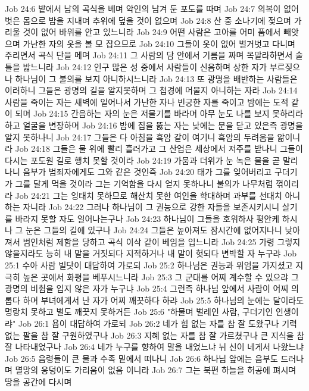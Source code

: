 Job 24:6  밭에서 남의 곡식을 베며 악인의 남겨 둔 포도를 따며
Job 24:7  의복이 없어 벗은 몸으로 밤을 지내며 추위에 덮을 것이 없으며
Job 24:8  산 중 소나기에 젖으며 가리울 것이 없어 바위를 안고 있느니라
Job 24:9  어떤 사람은 고아를 어미 품에서 빼앗으며 가난한 자의 옷을 볼 모 잡으므로
Job 24:10  그들이 옷이 없어 벌거벗고 다니며 주리면서 곡식 단을 메며
Job 24:11  그 사람의 담 안에서 기름을 짜며 목말라하면서 술 틀을 밟느니라
Job 24:12  인구 많은 성 중에서 사람들이 신음하며 상한 자가 부르짖으나 하나님이 그 불의를 보지 아니하시느니라
Job 24:13  또 광명을 배반하는 사람들은 이러하니 그들은 광명의 길을 알지못하며 그 첩경에 머물지 아니하는 자라
Job 24:14  사람을 죽이는 자는 새벽에 일어나서 가난한 자나 빈궁한 자를 죽이고 밤에는 도적 같이 되며
Job 24:15  간음하는 자의 눈은 저물기를 바라며 아무 눈도 나를 보지 못하리라 하고 얼굴을 변장하며
Job 24:16  밤에 집을 뚫는 자는 낮에는 문을 닫고 있은즉 광명을 알지 못하나니
Job 24:17  그들은 다 아침을 흑암 같이 여기니 흑암의 두려움을 앎이니라
Job 24:18  그들은 물 위에 빨리 흘러가고 그 산업은 세상에서 저주를 받나니 그들이 다시는 포도원 길로 행치 못할 것이라
Job 24:19  가뭄과 더위가 눈 녹은 물을 곧 말리나니 음부가 범죄자에게도 그와 같은 것인즉
Job 24:20  태가 그를 잊어버리고 구더기가 그를 달게 먹을 것이라 그는 기억함을 다시 얻지 못하나니 불의가 나무처럼 꺾이리라
Job 24:21  그는 잉태치 못하므로 해산치 못한 여인을 학대하며 과부를 선대치 아니하는 자니라
Job 24:22  그러나 하나님이 그 권능으로 강한 자들을 보존시키시니 살기를 바라지 못할 자도 일어나는구나
Job 24:23  하나님이 그들을 호위하사 평안케 하시나 그 눈은 그들의 길에 있구나
Job 24:24  그들은 높아져도 잠시간에 없어지나니 낮아져서 범인처럼 제함을 당하고 곡식 이삭 같이 베임을 입느니라
Job 24:25  가령 그렇지 않을지라도 능히 내 말을 거짓되다 지적하거나 내 말이 헛되다 변박할 자 누구랴
Job 25:1  수아 사람 빌닷이 대답하여 가로되
Job 25:2  하나님은 권능과 위엄을 가지셨고 지극히 높은 곳에서 화평을 베푸시느니라
Job 25:3  그 군대를 어찌 계수할 수 있으랴 그 광명의 비췸을 입지 않은 자가 누구냐
Job 25:4  그런즉 하나님 앞에서 사람이 어찌 의롭다 하며 부녀에게서 난 자가 어찌 깨끗하다 하랴
Job 25:5  하나님의 눈에는 달이라도 명랑치 못하고 별도 깨끗지 못하거든
Job 25:6  "하물며 벌레인 사람, 구더기인 인생이랴"
Job 26:1  욥이 대답하여 가로되
Job 26:2  네가 힘 없는 자를 참 잘 도왔구나 기력 없는 팔을 참 잘 구원하였구나
Job 26:3  지혜 없는 자를 참 잘 가르쳤구나 큰 지식을 참 잘 나타내었구나
Job 26:4  네가 누구를 향하여 말을 내었느냐 뉘 신이 네게서 나왔느냐
Job 26:5  음령들이 큰 물과 수족 밑에서 떠나니
Job 26:6  하나님 앞에는 음부도 드러나며 멸망의 웅덩이도 가리움이 없음 이니라
Job 26:7  그는 북편 하늘을 허공에 펴시며 땅을 공간에 다시며
